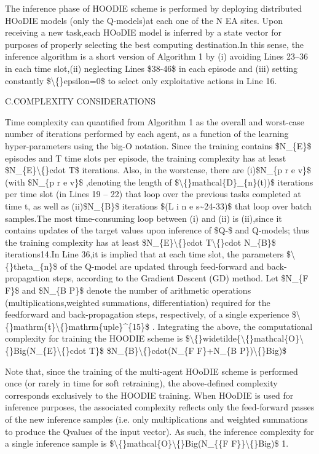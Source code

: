 \documentclass{article}
\begin{document}
The inference phase of HOODIE scheme is performed by deploying distributed HOoDIE models (only the Q-models)at each one of the N EA sites. Upon receiving a new task,each HOoDIE model is inferred by a state vector for purposes of properly selecting the best computing destination.In this sense, the inference algorithm is a short version of Algorithm 1 by (i) avoiding Lines 23–36 in each time slot,(ii) neglecting Lines \$38-46\$ in each episode and (iii) setting constantly \$\textbackslash\{\}epsilon=0\$ to select only exploitative actions in Line 16.

C.COMPLEXITY CONSIDERATIONS

Time complexity can quantified from Algorithm 1 as the overall and worst-case number of iterations performed by each agent, as a function of the learning hyper-parameters using the big-O notation. Since the training contains \$N\_\{E\}\$ episodes and T time slots per episode, the training complexity has at least \$N\_\{E\}\textbackslash\{\}cdot T\$ iterations. Also, in the worstcase, there are (i)\$N\_\{p r e v\}\$ (with \$N\_\{p r e v\}\$ ,denoting the length of \$\textbackslash\{\}mathcal\{D\}\_\{n\}(t))\$ iterations per time slot (in Lines 19 – 22) that loop over the previous tasks completed at time t, as well as (ii)\$N\_\{B\}\$ iterations \$(L i n e s\textasciitilde{}24-33)\$ that loop over batch samples.The most time-consuming loop between (i) and (ii) is (ii),since it contains updates of the target values upon inference of \$Q-\$ and Q-models; thus the training complexity has at least \$N\_\{E\}\textbackslash\{\}cdot T\textbackslash\{\}cdot N\_\{B\}\$ iterations14.In Line 36,it is implied that at each time slot, the parameters \$\textbackslash\{\}theta\_\{n\}\$ of the Q-model are updated through feed-forward and back-propagation steps, according to the Gradient Descent (GD) method. Let \$N\_\{F F\}\$ and \$N\_\{B P\}\$ denote the number of arithmetic operations (multiplications,weighted summations, differentiation) required for the feedforward and back-propagation steps, respectively, of a single experience \$\textbackslash\{\}mathrm\{t\}\textbackslash\{\}mathrm\{uple\}\textasciicircum{}\{15\}\$ . Integrating the above, the computational complexity for training the HOODIE scheme is \$\textbackslash\{\}widetilde\{\textbackslash\{\}mathcal\{O\}\textbackslash\{\}Big(N\_\{E\}\textbackslash\{\}cdot T\}\$ 
\$N\_\{B\}\textbackslash\{\}cdot(N\_\{F F\}+N\_\{B P\})\textbackslash\{\}Big)\$

Note that, since the training of the multi-agent HOoDIE scheme is performed once (or rarely in time for soft retraining), the above-defined complexity corresponds exclusively to the HOODIE training. When HOoDIE is used for inference purposes, the associated complexity reflects only the feed-forward passes of the new inference samples (i.e. only multiplications and weighted summations to produce the Qvalues of the input vector). As such, the inference complexity for a single inference sample is \$\textbackslash\{\}mathcal\{O\}\textbackslash\{\}Big(N\_\{\{F F\}\}\textbackslash\{\}Big)\$ 1.
\end{document}
